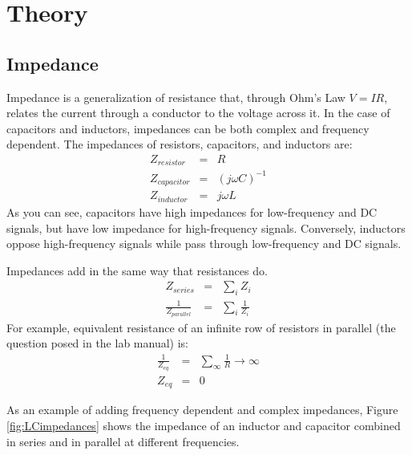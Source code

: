 \documentclass[12pt]{article}
\begin{document}
\section*{Theory}

\subsection*{Impedance}
Impedance is a generalization of resistance that, through Ohm's Law $V=IR$, relates the current through a conductor to the voltage across it. In the case of capacitors and inductors, impedances can be both complex and frequency dependent. The impedances of resistors, capacitors, and inductors are:
\begin{eqnarray}
Z_{resistor} &=& R\nonumber\\
Z_{capacitor} &=& (j\omega C)^{-1} \nonumber \\
Z_{inductor} &=& j\omega L \nonumber
\end{eqnarray}
As you can see, capacitors have high impedances for low-frequency and DC signals, but have low impedance for high-frequency signals. Conversely, inductors oppose high-frequency signals while pass through low-frequency and DC signals.

Impedances add in the same way that resistances do.
\begin{eqnarray}
Z_{series} &=& \sum_i{Z_i}\nonumber\\
\frac{1}{Z_{parallel}} &=& \sum_i{\frac{1}{Z_i}}\nonumber
\end{eqnarray}
For example, equivalent resistance of an infinite row of resistors in parallel (the question posed in the lab manual) is:
\begin{eqnarray}
\frac{1}{Z_{eq}} &=& \sum_\infty\frac{1}{R} \rightarrow \infty \nonumber \\
Z_{eq} &=& 0\nonumber
\end{eqnarray}

As an example of adding frequency dependent and complex impedances, Figure \ref{fig:LCimpedances} shows the impedance of an inductor and capacitor combined in series and in parallel at different frequencies.
\end{document}
